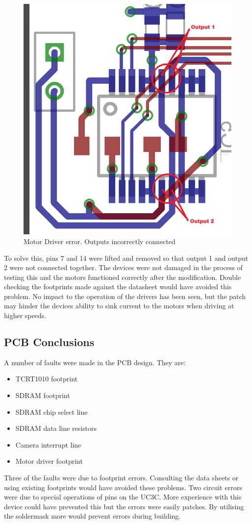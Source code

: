 \begin{figure}
\centering
\includegraphics[width = \textwidth /2]{./Figures/MotorDriver_error.png}
\caption{Motor Driver error. Outputs incorrectly connected}
\label{fig:Motor:Error}
\end{figure}

To solve this, pins 7 and 14 were lifted and removed so that output 1 and output 2 were not connected together. The devices were not damaged in the process of testing this and the motors functioned correctly after the modification. Double checking the footprints made against the datasheet would have avoided this problem. No impact to the operation of the drivers has been seen, but the patch may hinder the devices ability to sink current to the motors when driving at higher speeds. 

\subsection{PCB Conclusions}
A number of faults were made in the PCB design. They are:
\begin{itemize}
\item TCRT1010 footprint
\item SDRAM footprint
\item SDRAM chip select line
\item SDRAM data line resistors
\item Camera interrupt line
\item Motor driver footprint
\end{itemize}
Three of the faults were due to footprint errors. Consulting the data sheets or using existing footprints would have avoided these problems. Two circuit errors were due to special operations of pins on the UC3C. More experience with this device could have prevented this but the errors were easily patches. By utilising the soldermask more would prevent errors during building. 

